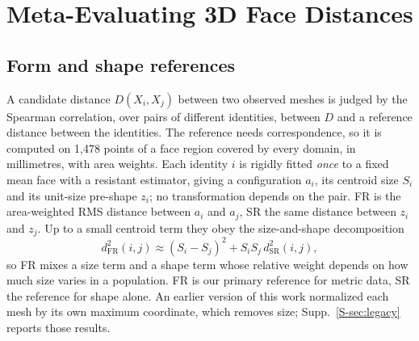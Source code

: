 \documentclass[10pt,twocolumn,letterpaper]{article}
\begin{document}
\section{Meta-Evaluating 3D Face Distances}
\label{sec:protocol}

\subsection{Form and shape references}
\label{sec:references}
A candidate distance $D(X_i,X_j)$ between two observed meshes is judged by the Spearman correlation, over pairs of different identities, between $D$ and a reference distance between the identities. The reference needs correspondence, so it is computed on 1{,}478 points of a face region covered by every domain, in millimetres, with area weights.
Each identity $i$ is rigidly fitted \emph{once} to a fixed mean face with a resistant estimator, giving a configuration $a_i$, its centroid size $S_i$ and its unit-size pre-shape $z_i$; no transformation depends on the pair. FR is the area-weighted RMS distance between $a_i$ and $a_j$, SR the same distance between $z_i$ and $z_j$. Up to a small centroid term they obey the size-and-shape decomposition
\begin{equation}
d_{\mathrm{FR}}^2(i,j)\approx(S_i-S_j)^2+S_iS_j\,d_{\mathrm{SR}}^2(i,j),
\label{eq:size_shape}
\end{equation}
so FR mixes a size term and a shape term whose relative weight depends on how much size varies in a population. FR is our primary reference for metric data, SR the reference for shape alone. An earlier version of this work normalized each mesh by its own maximum coordinate, which removes size; Supp.~\ref{S-sec:legacy} reports those results.
\end{document}
